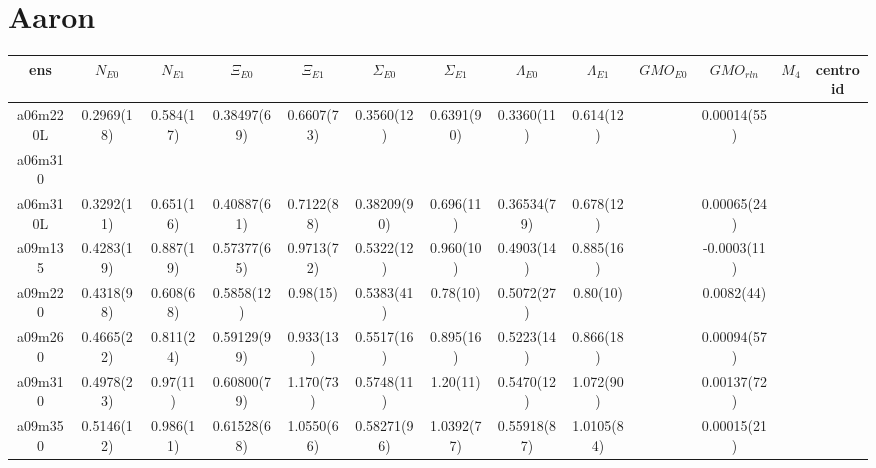 \documentclass{article}
\begin{document}
\clearpage
\section*{Aaron}
\begin{table}[h!]
 \centering
 \setlength{\arrayrulewidth}{0.5mm}
\setlength{\tabcolsep}{13pt}
\renewcommand{\arraystretch}{2}
 \begin{tabular}{|| c | c | c | c | c | c | c | c | c | c | c | c | c ||} 
 \hline
 ens & $N_{E0}$ & $N_{E1}$ & $\Xi_{E0}$ &  $\Xi_{E1}$ & $\Sigma_{E0}$ & $\Sigma_{E1}$ & $\Lambda_{E0}$ & $\Lambda_{E1}$ & $GMO_{E0}$ &  $GMO_{rln}$ & $M_4$ & centroid \\ [0.8ex] 
 \hline\hline
 a06m220L
  & 0.2969(18)   & 0.584(17)    & 0.38497(69)  & 0.6607(73)   & 0.3560(12)   & 0.6391(90)   & 0.3360(11)   & 0.614(12)    & {}           & 0.00014(55)  & {}           & {}          \\
 \hline
 a06m310
  & {}           & {}           & {}           & {}           & {}           & {}           & {}           & {}           & {}           & {}           & {}           & {}          \\
 \hline
 a06m310L
  & 0.3292(11)   & 0.651(16)    & 0.40887(61)  & 0.7122(88)   & 0.38209(90)  & 0.696(11)    & 0.36534(79)  & 0.678(12)    & {}           & 0.00065(24)  & {}           & {}          \\
 \hline
 a09m135
  & 0.4283(19)   & 0.887(19)    & 0.57377(65)  & 0.9713(72)   & 0.5322(12)   & 0.960(10)    & 0.4903(14)   & 0.885(16)    & {}           & -0.0003(11)  & {}           & {}          \\
 \hline
 a09m220
  & 0.4318(98)   & 0.608(68)    & 0.5858(12)   & 0.98(15)     & 0.5383(41)   & 0.78(10)     & 0.5072(27)   & 0.80(10)     & {}           & 0.0082(44)   & {}           & {}          \\
 \hline
 a09m260
  & 0.4665(22)   & 0.811(24)    & 0.59129(99)  & 0.933(13)    & 0.5517(16)   & 0.895(16)    & 0.5223(14)   & 0.866(18)    & {}           & 0.00094(57)  & {}           & {}          \\
 \hline
 a09m310
  & 0.4978(23)   & 0.97(11)     & 0.60800(79)  & 1.170(73)    & 0.5748(11)   & 1.20(11)     & 0.5470(12)   & 1.072(90)    & {}           & 0.00137(72)  & {}           & {}          \\
 \hline
 a09m350
  & 0.5146(12)   & 0.986(11)    & 0.61528(68)  & 1.0550(66)   & 0.58271(96)  & 1.0392(77)   & 0.55918(87)  & 1.0105(84)   & {}           & 0.00015(21)  & {}           & {}          \\

\end{tabular}
\end{table}
\end{document}
